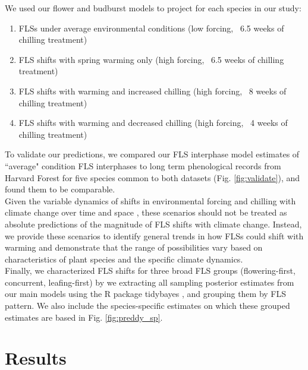 \documentclass[11pt]{article}\usepackage[]{graphicx}\usepackage[]{color}
\begin{document}
\noindent We used our flower and budburst models to project for each species in our study:
\begin{enumerate}
\item FLSs under average environmental conditions  (low forcing, ~6.5 weeks of chilling treatment)
\item FLS shifts with spring warming only (high forcing, ~6.5 weeks of chilling treatment)
\item FLS shifts with warming and increased chilling (high forcing, ~8 weeks of chilling treatment)
\item FLS shifts with warming and decreased chilling (high forcing, ~4 weeks of chilling treatment)
\end{enumerate}

\noindent To validate our predictions, we compared our FLS interphase model estimates of ``average" condition FLS interphases to long term phenological records from Harvard Forest \citep{OKeefe2015} for five species common to both datasets (Fig. \ref{fig:validate}), and found them to be comparable. \\

\noindent Given the variable dynamics of shifts in environmental forcing and chilling with climate change over time and space \citep{Luedeling:2011aa}, these scenarios should not be treated as absolute predictions of the magnitude of FLS shifts with climate change. Instead, we provide these scenarios to identify general trends in how FLSs could shift with warming and demonstrate that the range of possibilities vary based on characteristics of plant species and the specific climate dynamics.\\

\noindent Finally, we characterized FLS shifts for three broad FLS groups (flowering-first, concurrent, leafing-first) by we extracting all sampling posterior estimates from our main models using the R package tidybayes \citep{Kay2020}, and grouping them by FLS pattern. We also include the species-specific estimates on which these grouped estimates are based in Fig. \ref{fig:preddy_sp}.  \\ 

\section*{Results} 
\end{document}
